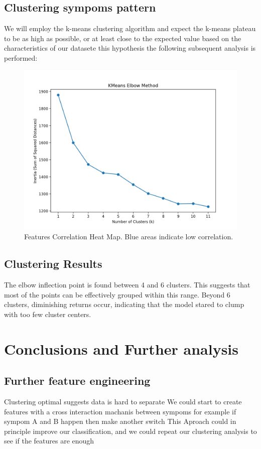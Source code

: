 \documentclass{article}
\begin{document}
\subsection{Clustering sympoms pattern}
We will employ the k-means clustering algorithm and expect the k-means plateau to be as high as possible, 
or at least close to the expected value based on the characteristics of our datasete this hypothesis the 
following subsequent analysis is performed:
\begin{figure}[H]  
    \centering
    \includegraphics[width=1\linewidth]{Kmeanselbow.png}
    \caption{Features Correlation Heat Map. Blue areas indicate low correlation.}
    \vspace{-1em} %
    \end{figure}

\subsection{Clustering Results}
The elbow inflection point is found between 4 and 6 clusters. This suggests that most of the points can be effectively grouped within this range. Beyond 6 clusters, diminishing returns occur, 
indicating that the model stared to clump with too few  cluster centers.


\section{Conclusions and Further analysis}
\subsection{Further feature engineering}
Clustering optimal suggests data is hard to separate 
We could start to create features with a cross interaction
machanis between sympoms for example if sympom A and B happen then make another switch
This Aproach could in principle improve our classification, and we could repeat our clustering
analysis to see if the features are enough 
\appendix
\end{document}

